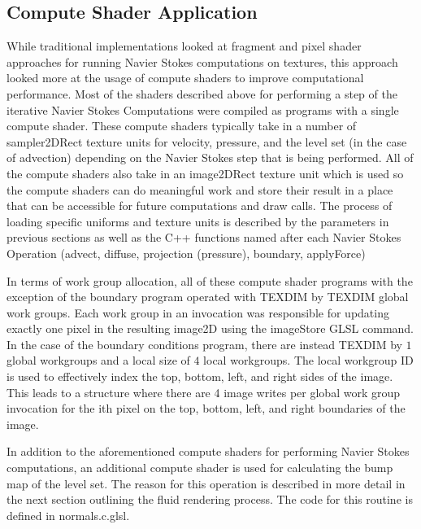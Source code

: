 \documentclass[conference]{IEEEtran}
\begin{document}
\subsection{Compute Shader Application}

While traditional implementations looked at fragment and pixel shader approaches for running Navier Stokes computations on textures, this approach looked more at the usage of compute shaders to improve computational performance. Most of the shaders described above for performing a step of the iterative Navier Stokes Computations were compiled as programs with a single compute shader. These compute shaders typically take in a number of sampler2DRect texture units for velocity, pressure, and the level set (in the case of advection) depending on the Navier Stokes step that is being performed. All of the compute shaders also take in an image2DRect texture unit which is used so the compute shaders can do meaningful work and store their result in a place that can be accessible for future computations and draw calls. The process of loading specific uniforms and texture units is described by the parameters in previous sections as well as the C++ functions named after each Navier Stokes Operation (advect, diffuse, projection (pressure), boundary, applyForce)

In terms of work group allocation, all of these compute shader programs with the exception of the boundary program operated with TEXDIM by TEXDIM global work groups. Each work group in an invocation was responsible for updating exactly one pixel in the resulting image2D using the imageStore GLSL command. In the case of the boundary conditions program, there are instead TEXDIM by $1$ global workgroups and a local size of $4$ local workgroups. The local workgroup ID is used to effectively index the top, bottom, left, and right sides of the image. This leads to a structure where there are 4 image writes per global work group invocation for the ith pixel on the top, bottom, left, and right boundaries of the image.

In addition to the aforementioned compute shaders for performing Navier Stokes computations, an additional compute shader is used for calculating the bump map of the level set. The reason for this operation is described in more detail in the next section outlining the fluid rendering process. The code for this routine is defined in normals.c.glsl.
\end{document}
